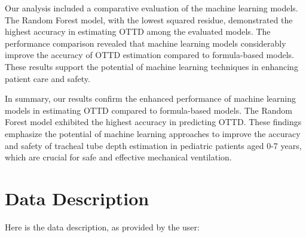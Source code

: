 \documentclass[11pt]{article}
\begin{document}
Our analysis included a comparative evaluation of the machine learning models. The Random Forest model, with the lowest squared residue, demonstrated the highest accuracy in estimating OTTD among the evaluated models. The performance comparison revealed that machine learning models considerably improve the accuracy of OTTD estimation compared to formula-based models. These results support the potential of machine learning techniques in enhancing patient care and safety.

In summary, our results confirm the enhanced performance of machine learning models in estimating OTTD compared to formula-based models. The Random Forest model exhibited the highest accuracy in predicting OTTD. These findings emphasize the potential of machine learning approaches to improve the accuracy and safety of tracheal tube depth estimation in pediatric patients aged 0-7 years, which are crucial for safe and effective mechanical ventilation.


\clearpage
\appendix

\section{Data Description} \label{sec:data_description} Here is the data description, as provided by the user:
\end{document}
